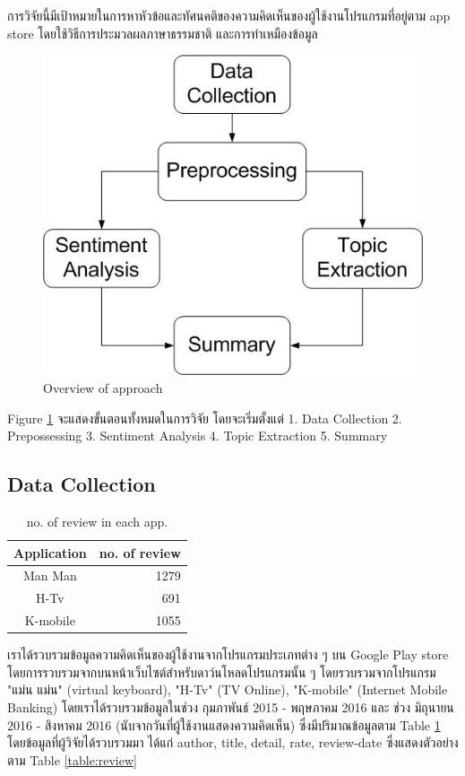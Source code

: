 การวิจัยนี้มีเป้าหมายในการหาหัวข้อและทัศนคติของความคิดเห็นของผู้ใช้งานโปรแกรมที่อยู่ตาม app store โดยใช้วิธีการประมวลผลภาษาธรรมชาติ และการทำเหมืองข้อมูล
\begin{figure}[h]
	\centering
	\includegraphics[width=.8\linewidth]{Process.jpg}
	\caption{Overview of approach}
	\label{fig:approachFig}
\end{figure}
Figure \ref{fig:approachFig} จะแสดงขั้นตอนทั้งหมดในการวิจัย โดยจะเริ่มตั้งแต่ 1. Data Collection 2. Prepossessing 3. Sentiment Analysis 4. Topic Extraction 5. Summary 
\subsection{Data Collection}

\begin{table}[h]
	\caption{no. of review in each app.}
	\label{table:NoOfReview}
	\centering
	\begin{tabular}{|c|r|}
		\hline
		Application & \multicolumn{1}{|c|}{no. of review} \\
		\hline
		Man Man & 1279\\
		\hline
		H-Tv & 691\\
		\hline
		K-mobile & 1055\\
		\hline
	\end{tabular}
\end{table}
เราได้รวบรวมข้อมูลความคิดเห็นของผู้ใช้งานจากโปรแกรมประเภทต่าง ๆ บน Google Play store โดยการรวบรวมจากบนหน้าเว็บไซต์สำหรับดาว์นโหลดโปรแกรมนั้น ๆ
โดยรวบรวมจากโปรแกรม "แม่น แม่น" (virtual keyboard), "H-Tv" (TV Online), "K-mobile" (Internet Mobile Banking) โดยเราได้รวบรวมข้อมูลในช่วง กุมภาพันธ์ 2015 - พฤษภาคม 2016 และ ช่วง มิถุนายน 2016 - สิงหาคม 2016 (นับจากวันที่ผู้ใช้งานแสดงความคิดเห็น) ซึ่งมีปริมาณข้อมูลตาม Table \ref{table:NoOfReview} โดยข้อมูลที่ผู้วิจัยได้รวบรวมมา ได้แก่ author, title, detail, rate, review-date ซึ่งแสดงตัวอย่างตาม Table \ref{table:review}


